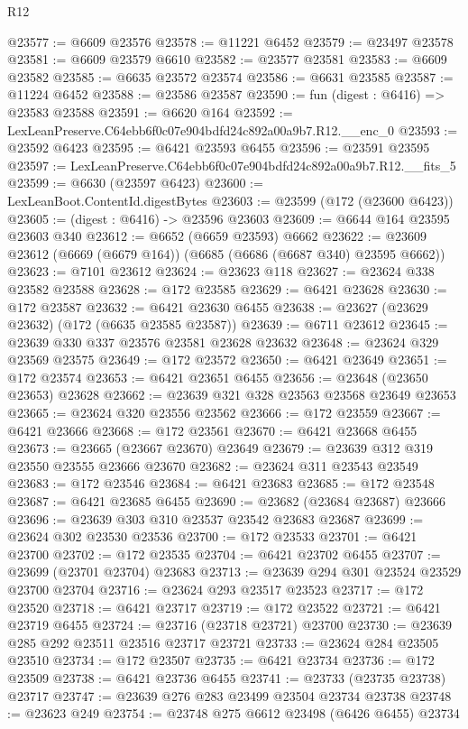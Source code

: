 \begin{lexlean}{R12}
\begin{coremodule}
@23577 := @6609 @23576
@23578 := @11221 @6452
@23579 := @23497 @23578
@23581 := @6609 @23579 @6610
@23582 := @23577 @23581
@23583 := @6609 @23582
@23585 := @6635 @23572 @23574
@23586 := @6631 @23585
@23587 := @11224 @6452
@23588 := @23586 @23587
@23590 := fun (digest : @6416) => @23583 @23588
@23591 := @6620 @164
@23592 := LexLeanPreserve.C64ebb6f0c07e904bdfd24c892a00a9b7.R12.__enc_0
@23593 := @23592 @6423
@23595 := @6421 @23593 @6455
@23596 := @23591 @23595
@23597 := LexLeanPreserve.C64ebb6f0c07e904bdfd24c892a00a9b7.R12.__fits_5
@23599 := @6630 (@23597 @6423)
@23600 := LexLeanBoot.ContentId.digestBytes
@23603 := @23599 (@172 (@23600 @6423))
@23605 := (digest : @6416) -> @23596 @23603
@23609 := @6644 @164 @23595 @23603 @340
@23612 := @6652 (@6659 @23593) @6662
@23622 := @23609 @23612 (@6669 (@6679 @164)) (@6685 (@6686 (@6687 @340) @23595 @6662))
@23623 := @7101 @23612
@23624 := @23623 @118
@23627 := @23624 @338 @23582 @23588
@23628 := @172 @23585
@23629 := @6421 @23628
@23630 := @172 @23587
@23632 := @6421 @23630 @6455
@23638 := @23627 (@23629 @23632) (@172 (@6635 @23585 @23587))
@23639 := @6711 @23612
@23645 := @23639 @330 @337 @23576 @23581 @23628 @23632
@23648 := @23624 @329 @23569 @23575
@23649 := @172 @23572
@23650 := @6421 @23649
@23651 := @172 @23574
@23653 := @6421 @23651 @6455
@23656 := @23648 (@23650 @23653) @23628
@23662 := @23639 @321 @328 @23563 @23568 @23649 @23653
@23665 := @23624 @320 @23556 @23562
@23666 := @172 @23559
@23667 := @6421 @23666
@23668 := @172 @23561
@23670 := @6421 @23668 @6455
@23673 := @23665 (@23667 @23670) @23649
@23679 := @23639 @312 @319 @23550 @23555 @23666 @23670
@23682 := @23624 @311 @23543 @23549
@23683 := @172 @23546
@23684 := @6421 @23683
@23685 := @172 @23548
@23687 := @6421 @23685 @6455
@23690 := @23682 (@23684 @23687) @23666
@23696 := @23639 @303 @310 @23537 @23542 @23683 @23687
@23699 := @23624 @302 @23530 @23536
@23700 := @172 @23533
@23701 := @6421 @23700
@23702 := @172 @23535
@23704 := @6421 @23702 @6455
@23707 := @23699 (@23701 @23704) @23683
@23713 := @23639 @294 @301 @23524 @23529 @23700 @23704
@23716 := @23624 @293 @23517 @23523
@23717 := @172 @23520
@23718 := @6421 @23717
@23719 := @172 @23522
@23721 := @6421 @23719 @6455
@23724 := @23716 (@23718 @23721) @23700
@23730 := @23639 @285 @292 @23511 @23516 @23717 @23721
@23733 := @23624 @284 @23505 @23510
@23734 := @172 @23507
@23735 := @6421 @23734
@23736 := @172 @23509
@23738 := @6421 @23736 @6455
@23741 := @23733 (@23735 @23738) @23717
@23747 := @23639 @276 @283 @23499 @23504 @23734 @23738
@23748 := @23623 @249
@23754 := @23748 @275 @6612 @23498 (@6426 @6455) @23734

\end{coremodule}
\end{lexlean}

